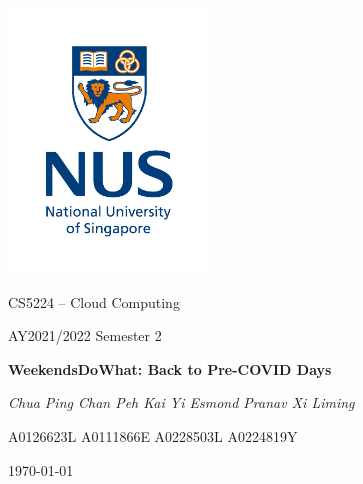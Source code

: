 \documentclass[12pt,a4paper]{article}
\begin{document}
\begin{titlepage}
  \centering
  
  \includegraphics[width=0.4\textwidth]{figures/nus.jpg}

  {\LARGE {CS5224 -- Cloud Computing} \par}
  {\Large {AY2021/2022 Semester 2} \par}
  
  \vspace{1cm}
  {\LARGE \bf{WeekendsDoWhat: Back to Pre-COVID Days} \par}

  \vspace{1.5cm}
  {\large \textit{Chua Ping Chan \qquad Peh Kai Yi Esmond \qquad Pranav \qquad Xi Liming} \par}
  {\hspace{0.6cm} A0126623L \hspace{2.5cm} A0111866E \hspace{1.6cm} A0228503L \hspace{0.6cm} A0224819Y \par}

  
  \vspace{2cm}
  \today    

  \vfill
\end{titlepage}

\renewcommand{\contentsname}{Table of Contents}	%
\tableofcontents
\thispagestyle{empty}
\end{document}
